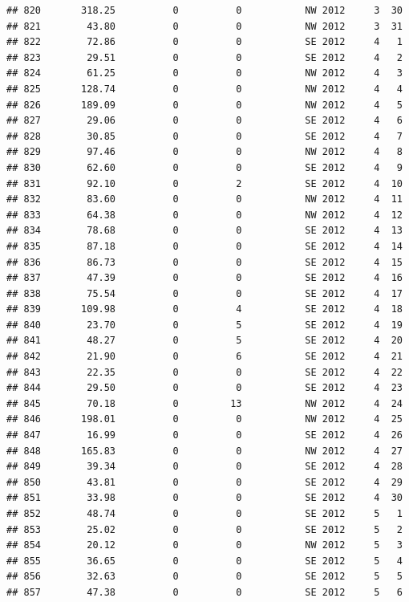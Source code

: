 \documentclass[
]{article}
\begin{document}
\begin{verbatim}
## 820       318.25          0          0           NW 2012     3  30
## 821        43.80          0          0           NW 2012     3  31
## 822        72.86          0          0           SE 2012     4   1
## 823        29.51          0          0           SE 2012     4   2
## 824        61.25          0          0           NW 2012     4   3
## 825       128.74          0          0           NW 2012     4   4
## 826       189.09          0          0           NW 2012     4   5
## 827        29.06          0          0           SE 2012     4   6
## 828        30.85          0          0           SE 2012     4   7
## 829        97.46          0          0           NW 2012     4   8
## 830        62.60          0          0           SE 2012     4   9
## 831        92.10          0          2           SE 2012     4  10
## 832        83.60          0          0           NW 2012     4  11
## 833        64.38          0          0           NW 2012     4  12
## 834        78.68          0          0           SE 2012     4  13
## 835        87.18          0          0           SE 2012     4  14
## 836        86.73          0          0           SE 2012     4  15
## 837        47.39          0          0           SE 2012     4  16
## 838        75.54          0          0           SE 2012     4  17
## 839       109.98          0          4           SE 2012     4  18
## 840        23.70          0          5           SE 2012     4  19
## 841        48.27          0          5           SE 2012     4  20
## 842        21.90          0          6           SE 2012     4  21
## 843        22.35          0          0           SE 2012     4  22
## 844        29.50          0          0           SE 2012     4  23
## 845        70.18          0         13           NW 2012     4  24
## 846       198.01          0          0           NW 2012     4  25
## 847        16.99          0          0           SE 2012     4  26
## 848       165.83          0          0           NW 2012     4  27
## 849        39.34          0          0           SE 2012     4  28
## 850        43.81          0          0           SE 2012     4  29
## 851        33.98          0          0           SE 2012     4  30
## 852        48.74          0          0           SE 2012     5   1
## 853        25.02          0          0           SE 2012     5   2
## 854        20.12          0          0           NW 2012     5   3
## 855        36.65          0          0           SE 2012     5   4
## 856        32.63          0          0           SE 2012     5   5
## 857        47.38          0          0           SE 2012     5   6

\end{verbatim}
\end{document}

